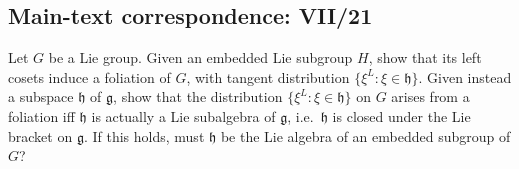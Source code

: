 \subsection*{Main-text correspondence: VII/21}

\begin{problem}
\label{prob:cp-vii-0038}
Let $G$ be a Lie group. Given an embedded Lie subgroup $H$, show that its left cosets induce a foliation of $G$,
with tangent distribution $\{\xi^L:\xi\in\mathfrak h\}$.
Given instead a subspace $\mathfrak h$ of $\mathfrak g$, show that the distribution $\{\xi^L:\xi\in\mathfrak h\}$
on $G$ arises from a foliation iff $\mathfrak h$ is actually a Lie subalgebra of $\mathfrak g$, i.e.\ $\mathfrak h$
is closed under the Lie bracket on $\mathfrak g$.
If this holds, must $\mathfrak h$ be the Lie algebra of an embedded subgroup of $G$?
\end{problem}

